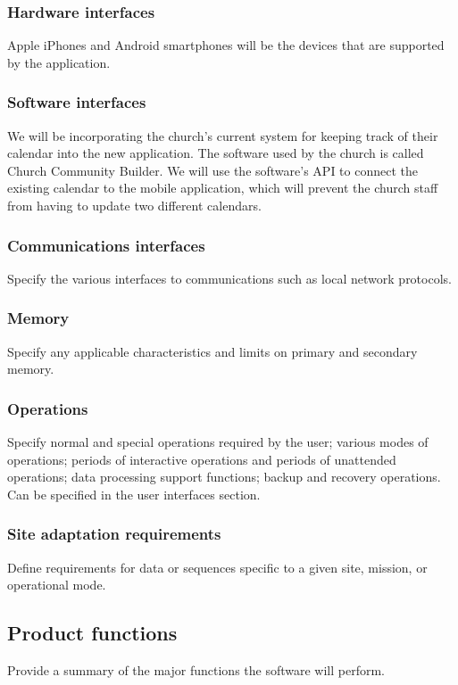 \documentclass[letterpaper,10pt,draftclsnofoot,onecolumn,titlepage]{IEEEtran}
\begin{document}
	\subsubsection{Hardware interfaces}
	Apple iPhones and Android smartphones will be the devices that are supported by the application.

	\subsubsection{Software interfaces}
	We will be incorporating the church's current system for keeping track of their calendar into the new application.
	The software used by the church is called Church Community Builder.
	We will use the software's API to connect the existing calendar to the mobile application, which will prevent the church staff from having to update two different calendars.

	\subsubsection{Communications interfaces}
	Specify the various interfaces to communications such as local network protocols.

	\subsubsection{Memory}
	Specify any applicable characteristics and limits on primary and secondary memory.

	\subsubsection{Operations}
	Specify normal and special operations required by the user; various modes of operations; periods of interactive operations and periods of unattended operations; data processing support functions; backup and recovery operations.
	Can be specified in the user interfaces section.

	\subsubsection{Site adaptation requirements}
	Define requirements for data or sequences specific to a given site, mission, or operational mode.

	\subsection{Product functions}
	Provide a summary of the major functions the software will perform.
\end{document}
